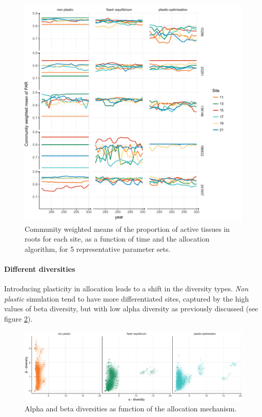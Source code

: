

\begin{figure}%
    \includegraphics[width=1\linewidth]{./2_PP/Figures/Comm/comm_variability_lines.pdf}%
  \caption[Spatial and temporal variability of the CWMs of the PAR]{Community weighted means of the proportion of active tissues in roots for each site, as a function of time and the allocation algorithm, for 5 representative parameter sets.}
  \label{fg:comm_strat}
\end{figure}


\paragraph{Different diversities}

Introducing plasticity in allocation leads to a shift in the diversity types. \textit{Non plastic} simulation tend to have more differentiated sites, captured by the high values of beta diversity, but with low alpha diversity as previously discussed (see figure \ref{fig:diversities}). 

\begin{figure}\label{fig:diversities}
\includegraphics[]{./2_PP/Figures/Comm/comm_div_differences_alpha_beta.pdf}
\caption[Alpha and beta diversities as function of the allocation mechanism.]{Alpha and beta diversities as function of the allocation mechanism.}
\end{figure}

